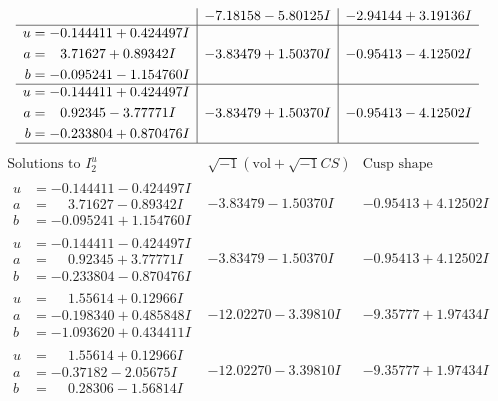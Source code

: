 \documentclass[1p]{elsarticle_modified}
\theoremstyle{definition}
\newcommand{\I}{\sqrt{-1}}
\begin{document}
$$\begin{array}{c|c|c}
 & -7.18158 - 5.80125 I & -2.94144 + 3.19136 I \\ \hline\begin{aligned}
u &= -0.144411 + 0.424497 I \\
a &= \phantom{-}3.71627 + 0.89342 I \\
b &= -0.095241 - 1.154760 I\end{aligned}
 & -3.83479 + 1.50370 I & -0.95413 - 4.12502 I \\ \hline\begin{aligned}
u &= -0.144411 + 0.424497 I \\
a &= \phantom{-}0.92345 - 3.77771 I \\
b &= -0.233804 + 0.870476 I\end{aligned}
 & -3.83479 + 1.50370 I & -0.95413 - 4.12502 I\\
 \hline 
 \end{array}$$\newpage$$\begin{array}{c|c|c}  
\text{Solutions to }I^u_{2}& \I (\text{vol} + \sqrt{-1}CS) & \text{Cusp shape}\\
 \hline 
\begin{aligned}
u &= -0.144411 - 0.424497 I \\
a &= \phantom{-}3.71627 - 0.89342 I \\
b &= -0.095241 + 1.154760 I\end{aligned}
 & -3.83479 - 1.50370 I & -0.95413 + 4.12502 I \\ \hline\begin{aligned}
u &= -0.144411 - 0.424497 I \\
a &= \phantom{-}0.92345 + 3.77771 I \\
b &= -0.233804 - 0.870476 I\end{aligned}
 & -3.83479 - 1.50370 I & -0.95413 + 4.12502 I \\ \hline\begin{aligned}
u &= \phantom{-}1.55614 + 0.12966 I \\
a &= -0.198340 + 0.485848 I \\
b &= -1.093620 + 0.434411 I\end{aligned}
 & -12.02270 - 3.39810 I & -9.35777 + 1.97434 I \\ \hline\begin{aligned}
u &= \phantom{-}1.55614 + 0.12966 I \\
a &= -0.37182 - 2.05675 I \\
b &= \phantom{-}0.28306 - 1.56814 I\end{aligned}
 & -12.02270 - 3.39810 I & -9.35777 + 1.97434 I \\ \hline\begin{aligned}

\end{aligned}
\end{array}$$
\end{document}
